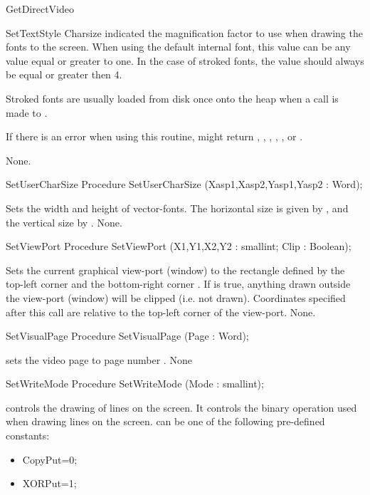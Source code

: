 \begin{function}{GetDirectVideo}
\begin{procedure}{SetTextStyle}
Charsize indicated the magnification factor to use when drawing the fonts
to the screen. When using the default internal font, this value can be
any value equal or greater to one. In the case of stroked fonts, the
value should always be equal or greater then 4.

Stroked fonts are usually loaded from disk once onto the heap when a call
is made to .

If there is an error when using this routine,  might return
, , , ,
, or .

\Errors
None.
\SeeAlso
{}
\end{procedure}
\begin{procedure}{SetUserCharSize}
\Declaration
Procedure SetUserCharSize (Xasp1,Xasp2,Yasp1,Yasp2 : Word);

\Description
Sets the width and height of vector-fonts. The horizontal size is given
by , and the vertical size by .
\Errors
None.
\SeeAlso
{}
\end{procedure}
\begin{procedure}{SetViewPort}
\Declaration
Procedure SetViewPort (X1,Y1,X2,Y2 : smallint; Clip : Boolean);

\Description
Sets the current graphical view-port (window) to the rectangle defined by
the top-left corner  and the bottom-right corner .
If  is true, anything drawn outside the view-port (window) will be
clipped (i.e. not drawn). Coordinates specified after this call are relative
to the top-left corner of the view-port.
\Errors
None.
\SeeAlso
{}
\end{procedure}
\begin{procedure}{SetVisualPage}
\Declaration
Procedure SetVisualPage (Page : Word);

\Description
{} sets the video page to page number .
\Errors
None
\SeeAlso
{}
\end{procedure}
\begin{procedure}{SetWriteMode}
\Declaration
Procedure SetWriteMode (Mode : smallint);

\Description
{} controls the drawing of lines on the screen. It controls
the binary operation used when drawing lines on the screen.  can
be one of the following pre-defined constants:
\begin{itemize}
\item CopyPut=0;
\item XORPut=1;
\end{itemize}


\end{procedure}
\end{function}
